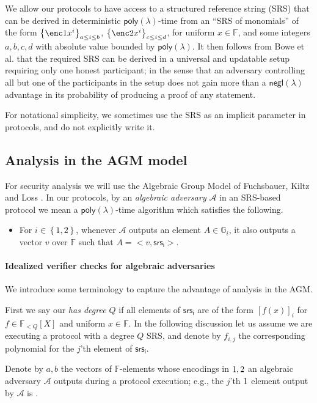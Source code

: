\documentclass[11pt]{article} %
\newcommand{\Gi}{\ensuremath{{\mathbb G}_i}\xspace}
\newcommand{\F}{\ensuremath{\mathbb F}\xspace}
\newcommand{\adv}{\ensuremath{\mathcal A}\xspace}
\newcommand{\srsi}{\ensuremath{\mathsf{srs_i}}\xspace}
\newcommand{\negl}{\ensuremath{\mathsf{negl}(\lambda)}\xspace}
\newcommand{\sett}[2]{\ensuremath{\set{#1}_{#2}}\xspace}
\newcommand{\enci}[1]{\ensuremath{\left[#1\right]_i}\xspace}
\newcommand{\set}[1]{\ensuremath{\left\{#1\right\}}\xspace}
\newcommand{\polysofdeg}[1]{\ensuremath{\F_{< #1}[X]}\xspace}
\newcommand{\poly}{\ensuremath{\mathsf{poly(\lambda)}}\xspace}
\begin{document}
We allow our protocols to have access to a structured reference string (SRS) that can be derived in deterministic \poly-time from an ``SRS of monomials'' of the form
\sett{\enc1{x^i}}{a\leq i \leq b}, \sett{\enc2{x^i}}{c\leq i \leq d}, for uniform $x\in \F$,
and some integers $a,b,c,d$ with absolute value bounded by \poly.
It then follows from Bowe et al. \cite{SecondMPC} that the required SRS can be derived in a universal and updatable setup\cite{firstUniversal} requiring only one honest participant; in the sense that an adversary controlling all but one of the participants in the setup does not gain more than a \negl advantage in its probability of producing a proof of any statement.

For notational simplicity, we sometimes use the SRS  as an implicit parameter in protocols, and do not explicitly write it.

\subsection{Analysis in the AGM model}\label{subsec:AGM}
For security analysis we will use the Algebraic Group Model of Fuchsbauer, Kiltz and Loss \cite{AGM}.
In our protocols, by an \emph{algebraic adversary} \adv in an SRS-based protocol we mean a \poly-time algorithm which satisfies the following.
\begin{itemize}
 \item For $i\in \set{1,2}$, whenever \adv outputs an element $A\in \Gi$, it also outputs a vector $v$ over \F such that $A = <v,\srsi>$.
\end{itemize}

\paragraph{Idealized verifier checks for algebraic adversaries}
We introduce some terminology to capture the advantage of analysis in the AGM.

First we say our  \emph{has degree $Q$} if all elements of \srsi are of the form  \enci{f(x)} for $f\in \polysofdeg{Q}$ and uniform $x\in \F$. In the following discussion let us assume we are executing a protocol with a degree $Q$ SRS, and denote by $f_{i,j}$ the corresponding polynomial for the $j$'th element of \srsi.

Denote by $a,b$ the vectors of $\F$-elements whose encodings in $\G1,\G2$ an algebraic adversary \adv outputs during a protocol execution; e.g., the $j$'th $\G1$ element output by \adv is .
\end{document}
